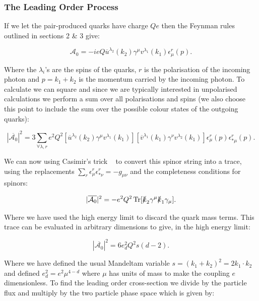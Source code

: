 	\subsubsection{The Leading Order Process}

	If we let the pair-produced quarks have charge $Qe$ then the Feynman rules outlined in sections 2 \& 3 give:

	\begin{equation}
	\mathcal{A}_0 = -ieQ\overline{u}^{\lambda_2}(k_2)\gamma^\mu v^{\lambda_1}(k_1)\epsilon^r_\mu(p).
	\end{equation}

	Where the $\lambda_i$'s are the spins of the quarks, $r$ is the polarisation of the incoming photon and $p = k_1 + k_2$ is
	the momentum carried by the incoming photon.  To calculate we can square and since we are typically interested in unpolarised
	calculations we perform a sum over all polarisations and spins (we also choose this point to include the sum over the possible
	colour states of the outgoing quarks):

	\begin{equation}
	|\overline{\mathcal{A}_0}|^2 = 3\sum_{\forall\lambda, r}e^2Q^2[\overline{u}^{\lambda_2}(k_2)\gamma^\mu
	v^{\lambda_1}(k_1)][\overline{v}^{\lambda_1}(k_1)\gamma^\nu v^{\lambda_2}(k_1)]\epsilon^r_\mu(p)\epsilon^r_{*\mu}(p).
	\end{equation}

	We can now using Casimir's trick ~\cite{griff} to convert this spinor string into a trace, using the replacements
	$\sum_r\epsilon^r_\mu\epsilon^r_{*\nu}=-g_{\mu\nu}$ and the completeness conditions for spinors:

	\begin{equation}
	|\overline{\mathcal{A}_0}|^2 = - e^2Q^2\operatorname{Tr}[\slashed k_2\gamma^\mu\slashed k_1\gamma_\mu].
	\end{equation}

	Where we have used the high energy limit to discard the quark mass terms.  This trace can be evaluated in arbitrary
	dimensions to give, in the high energy limit:

	\begin{equation}
	|\overline{\mathcal{A}_0}|^2 = 6e_d^2Q^2s(d-2).
	\end{equation}

	Where we have defined the usual Mandeltam variable $s=(k_1+k_2)^2=2k_1\cdot k_2$ and defined $e_d^2=e^2\mu^{4-d}$ where
	$\mu$ has units of mass to make the coupling $e$ dimensionless.  To find the leading order cross-section we divide by the
	particle flux and multiply by the two particle phase space which is given by:

